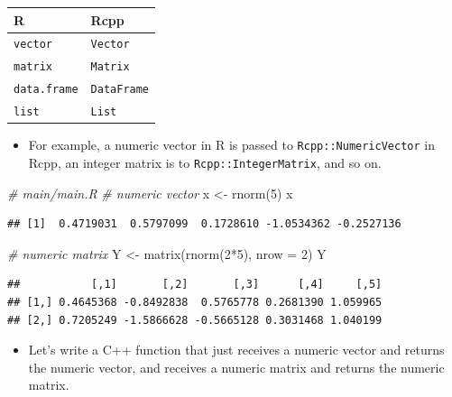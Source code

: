 \documentclass[
]{book}
\newenvironment{Shaded}{\begin{snugshade}}{\end{snugshade}}
\newcommand{\AttributeTok}[1]{\textcolor[rgb]{0.77,0.63,0.00}{#1}}
\newcommand{\CommentTok}[1]{\textcolor[rgb]{0.56,0.35,0.01}{\textit{#1}}}
\newcommand{\DecValTok}[1]{\textcolor[rgb]{0.00,0.00,0.81}{#1}}
\newcommand{\FunctionTok}[1]{\textcolor[rgb]{0.00,0.00,0.00}{#1}}
\newcommand{\NormalTok}[1]{#1}
\newcommand{\OtherTok}[1]{\textcolor[rgb]{0.56,0.35,0.01}{#1}}
\newcommand{\SpecialCharTok}[1]{\textcolor[rgb]{0.00,0.00,0.00}{#1}}
\providecommand{\tightlist}{%
  \setlength{\itemsep}{0pt}\setlength{\parskip}{0pt}}
\begin{document}
\begin{longtable}[]{@{}ll@{}}
\toprule()
R & Rcpp \\
\midrule()
\endhead
\texttt{vector} & \texttt{Vector} \\
\texttt{matrix} & \texttt{Matrix} \\
\texttt{data.frame} & \texttt{DataFrame} \\
\texttt{list} & \texttt{List} \\
\bottomrule()
\end{longtable}

\begin{itemize}
\tightlist
\item
  For example, a numeric vector in R is passed to \texttt{Rcpp::NumericVector} in Rcpp, an integer matrix is to \texttt{Rcpp::IntegerMatrix}, and so on.
\end{itemize}

\begin{Shaded}
\begin{Highlighting}[]
\CommentTok{\# main/main.R}
\CommentTok{\# numeric vector }
\NormalTok{x }\OtherTok{\textless{}{-}} \FunctionTok{rnorm}\NormalTok{(}\DecValTok{5}\NormalTok{)}
\NormalTok{x}
\end{Highlighting}
\end{Shaded}

\begin{verbatim}
## [1]  0.4719031  0.5797099  0.1728610 -1.0534362 -0.2527136
\end{verbatim}

\begin{Shaded}
\begin{Highlighting}[]
\CommentTok{\# numeric matrix}
\NormalTok{Y }\OtherTok{\textless{}{-}} \FunctionTok{matrix}\NormalTok{(}\FunctionTok{rnorm}\NormalTok{(}\DecValTok{2}\SpecialCharTok{*}\DecValTok{5}\NormalTok{), }\AttributeTok{nrow =} \DecValTok{2}\NormalTok{)}
\NormalTok{Y}
\end{Highlighting}
\end{Shaded}

\begin{verbatim}
##           [,1]       [,2]       [,3]      [,4]     [,5]
## [1,] 0.4645368 -0.8492838  0.5765778 0.2681390 1.059965
## [2,] 0.7205249 -1.5866628 -0.5665128 0.3031468 1.040199
\end{verbatim}

\begin{itemize}
\tightlist
\item
  Let's write a C++ function that just receives a numeric vector and returns the numeric vector, and receives a numeric matrix and returns the numeric matrix.
\end{itemize}
\end{document}
